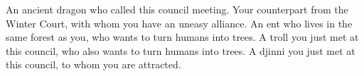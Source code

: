 \documentclass[char]{guildcamp2}
\begin{document}
\begin{contacts}
  \contact{\cOnyx{}} An ancient dragon who called this council meeting.
  \contact{\cBabyFae{}} Your counterpart from the Winter Court, with whom you have an uneasy alliance.
  \contact{\cEnt{}} An ent who lives in the same forest as you, who wants to turn humans into trees.
  \contact{\cTroll{}} A troll you just met at this council, who also wants to turn humans into trees.
  \contact{\cWizard{}} A djinni you just met at this council, to whom you are attracted.
\end{contacts}



\end{document}
